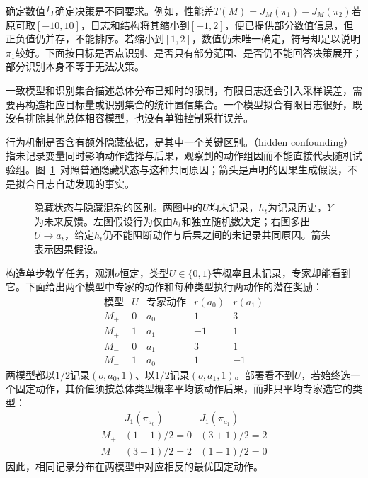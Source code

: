 确定数值与确定决策是不同要求。例如，性能差$T(M)=J_M(\pi_1)-J_M(\pi_2)$若原可取$[-10,10]$，日志和结构将其缩小到$[-1,2]$，便已提供部分数值信息，但正负值仍并存，不能排序。若缩小到$[1,2]$，数值仍未唯一确定，符号却足以说明$\pi_1$较好。下面按目标是否点识别、是否只有部分范围、是否仍不能回答决策展开；部分识别本身不等于无法决策。

一致模型和识别集合描述总体分布已知时的限制，有限日志还会引入采样误差，需要再构造相应目标量或识别集合的统计置信集合。一个模型拟合有限日志很好，既没有排除其他总体相容模型，也没有单独控制采样误差。

行为机制是否含有额外隐藏依据，是其中一个关键区别。（hidden confounding）指未记录变量同时影响动作选择与后果，观察到的动作组因而不能直接代表随机试验组。图~\ref{fig:rl-information-confounding}~对照普通隐藏状态与这种共同原因；箭头是声明的因果生成假设，不是拟合日志自动发现的事实。

\begin{figure}[htbp]
  \centering
  
  \caption{隐藏状态与隐藏混杂的区别。两图中的$U$均未记录，$h_t$为记录历史，$Y$为未来反馈。左图假设行为仅由$h_t$和独立随机数决定；右图多出$U\to a_t$，给定$h_t$仍不能阻断动作与后果之间的未记录共同原因。箭头表示因果假设。}
  \label{fig:rl-information-confounding}
\end{figure}

\begin{example}[同样日志与相反的动作价值]
  \label{ex:rl-information-confounding}
  构造单步教学任务，观测$o$恒定，类型$U\in\{0,1\}$等概率且未记录，专家却能看到它。下面给出两个模型中专家的动作和每种类型执行两动作的潜在奖励：
  \[
  \begin{array}{cc|c|rr}
    \text{模型}&U&\text{专家动作}&r(a_0)&r(a_1)\\
    \hline
    M_+&0&a_0&1&3\\
    M_+&1&a_1&-1&1\\
    M_-&0&a_1&3&1\\
    M_-&1&a_0&1&-1
  \end{array}
  \]
  两模型都以$1/2$记录$(o,a_0,1)$、以$1/2$记录$(o,a_1,1)$。部署看不到$U$，若始终选一个固定动作，其价值须按总体类型概率平均该动作后果，而非只平均专家选它的类型：
  \[
  \begin{array}{c|rr}
    &J_1(\pi_{a_0})&J_1(\pi_{a_1})\\
    \hline
    M_+&(1-1)/2=0&(3+1)/2=2\\
    M_-&(3+1)/2=2&(1-1)/2=0
  \end{array}
  \]
  因此，相同记录分布在两模型中对应相反的最优固定动作。
\end{example}


